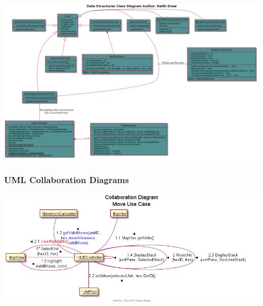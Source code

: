 \documentclass[12pt,a4paper,titlepage]{article}
\begin{document}
\begin{center}
\includegraphics[width=\linewidth]{dataDiagram.png}
\end{center}
\pagebreak
\subsubsection{UML Collaboration Diagrams}
\begin{center}
\includegraphics[width=\linewidth]{CollaborationMoveUnit.png}
\end{center}
\pagebreak
\end{document}
